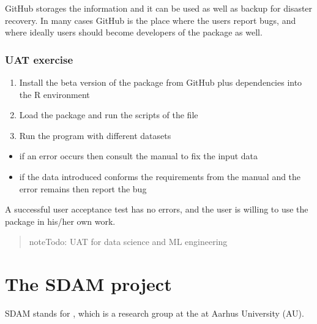 \documentclass[a4paper,12pt,english]{sphinxhowto}
\begin{document}
GitHub storages the information and it can be used as well as backup for
disaster recovery. In many cases GitHub is the place where the users
report bugs, and where ideally users should become developers of the
package as well.



\subsubsection{UAT exercise}
\label{\detokenize{UAT:uat-exercise}}\begin{enumerate}
%
\item {} 
Install the beta version of the package from GitHub plus dependencies into the R environment

\item {} 
Load the package and run the scripts of the  file

\item {} 
Run the program with different datasets

\end{enumerate}
\begin{itemize}
\item {} 
if an error occurs then consult the manual to fix the input data

\item {} 
if the data introduced conforms the requirements from the manual and the error remains then report the bug

\end{itemize}

A successful user acceptance test has no errors, and the user is willing
to use the package in his/her own work.


\begin{quote}

\begin{sphinxadmonition}{note}{\label{\detokenize{UAT:id1}}Todo:}
UAT for data science and ML engineering
\end{sphinxadmonition}
\end{quote}



\section{The SDAM project}
\label{\detokenize{sdam:the-sdam-project}}\label{\detokenize{sdam:sdam-proj}}\label{\detokenize{sdam::doc}}
SDAM stands for ,
which is a research group at the  at
Aarhus University (AU).
\end{document}
